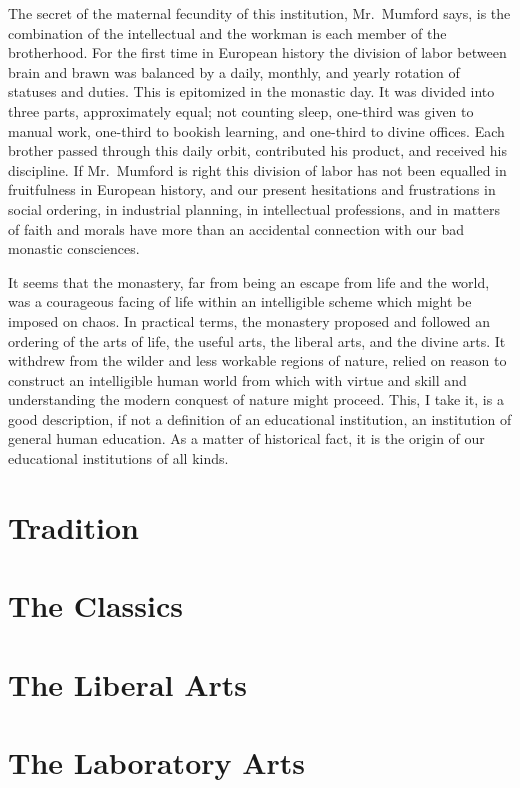 \documentclass{memoir}
\begin{document}
The secret of the maternal fecundity of this institution, Mr.\ Mumford
says, is the combination of the intellectual and the workman is each
member of the brotherhood. For the first time in European history the
division of labor between brain and brawn was balanced by a daily,
monthly, and yearly rotation of statuses and duties. This is epitomized
in the monastic day. It was divided into three parts, approximately
equal; not counting sleep, one-third was given to manual work, one-third
to bookish learning, and one-third to divine offices. Each brother
passed through this daily orbit, contributed his product, and received
his discipline. If Mr.\ Mumford is right this division of labor has
not been equalled in fruitfulness in European history, and our present
hesitations and frustrations in social ordering, in industrial planning,
in intellectual professions, and in matters of faith and morals have more
than an accidental connection with our bad monastic consciences.

It seems that the monastery, far from being an escape from life and the
world, was a courageous facing of life within an intelligible scheme
which might be imposed on chaos. In practical terms, the monastery
proposed and followed an ordering of the arts of life, the useful arts,
the liberal arts, and the divine arts. It withdrew from the wilder
and less workable regions of nature, relied on reason to construct
an intelligible human world from which with virtue and skill and
understanding the modern conquest of nature might proceed. This, I
take it, is a good description, if not a definition of an educational
institution, an institution of general human education. As a matter of
historical fact, it is the origin of our educational institutions of all
kinds.


\chapter{Tradition}

\chapter{The Classics}
\chapter{The Liberal Arts}
\chapter{The Laboratory Arts}
\end{document}
